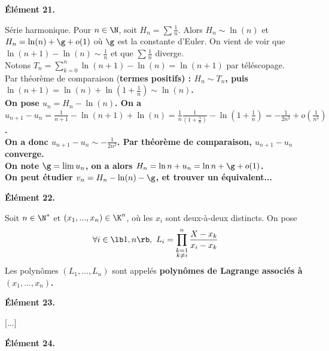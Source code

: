 \documentclass[11pt]{article}
\begin{document}
\bf{Élément 21.}

\begin{prop}{Série harmonique.}{}
    Pour $n\in\N$, soit $H_n=\sum \frac{1}{n}$. Alors $H_n\sim\ln(n)$ et $H_n=\ln(n)+\g+o(1)$ où $\g$ est la constante d'Euler.
    \tcblower
    On vient de voir que $\ln(n+1)-\ln(n)\sim\frac{1}{n}$ et que $\sum\frac{1}{n}$ diverge.\\
    Notons $T_n=\sum_{k=0}^n\ln(n+1)-\ln(n)=\ln(n+1)$ par téléscopage.\\
    Par théorème de comparaison (\bf{termes positifs}) : $H_n\sim T_n$, puis $\ln(n+1)=\ln(n)+\ln(1+\frac{1}{n})\sim \ln(n)$.\\
    On pose $u_n=H_n-\ln(n)$. On a $u_{n+1}-u_n = \frac{1}{n+1}-\ln(n+1)+\ln(n)=\frac{1}{n}\frac{1}{(1+\frac{1}{n})}-\ln(1+\frac{1}{n})=-\frac{1}{2n^2}+o(\frac{1}{n^2})$.\\
    On a donc $u_{n+1}-u_n\sim-\frac{1}{2n^2}$. Par théorème de comparaison, $u_{n+1}-u_n$ converge.\\
    On note $\g=\lim u_n$, on a alors $H_n=\ln n + u_n = \ln n + \g + o(1)$.\\
    On peut étudier $v_n = H_n - \ln(n) - \g$, et trouver un équivalent...
\end{prop}

\bf{Élément 22.}

\begin{defi}{}{}
    Soit $n\in\N^*$ et $(x_1,...,x_n)\in\K^n$, où les $x_i$ sont deux-à-deux distincts. On pose
    \begin{equation*}
        \forall i \in \lb1,n\rb, ~ L_i = \prod_{\substack{k=1\\k\neq i}}^n\frac{X-x_k}{x_i-x_k}
    \end{equation*}
    Les polynômes $(L_1,...,L_n)$ sont appelés \bf{polynômes de Lagrange} associés à $(x_1,...,x_n)$.
\end{defi}

\pagebreak

\bf{Élément 23.}

[...]

\bf{Élément 24.}
\end{document}
